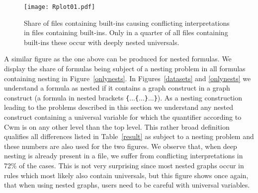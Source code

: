 \begin{figure}
 \texttt{[image: Rplot01.pdf]}
 \caption{Share of files containing built-ins causing conflicting interpretations in
 files containing built-ins. Only in a quarter of all files containing built-ins 
 these occur with deeply nested universals.
\label{builtins}}
\end{figure}  
 
A similar figure as the one above can be produced for nested formulas. We display the share of formulas being subject of a nesting problem in all 
formulas containing nesting in Figure~\ref{onlynests}. In Figures~\ref{datasets} and \ref{onlynests} we understand a formula as nested if it contains 
a graph construct in a graph construct (\ie a formula in nested brackets \texttt{\{}$\ldots$\texttt{\{}$\ldots$\texttt{\}}$\ldots$\texttt{\}}). 
As a nesting construction leading to the problems described in this section we understand any nested construct containing a universal variable 
for which the quantifier according to Cwm is %
on any other level than the top level. This rather broad definition qualifies all differences listed in Table~\ref{result} as subject to a nesting problem and these 
numbers are also used for the two figures.
% 
We observe that, when deep nesting is already present in a file, we suffer from conflicting interpretations in 72\% of the cases.
This is not very surprising since most nested graphs occur in rules which most likely also contain universals, but this figure shows once again, that when using nested graphs, users need to be careful 
with universal variables.

